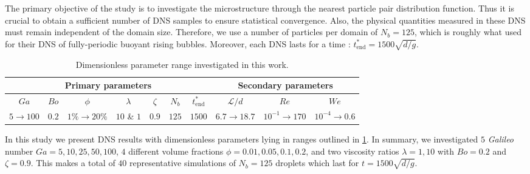 The primary objective of the study is to investigate the microstructure through the nearest particle pair distribution function.
Thus it is crucial to obtain a sufficient number of DNS samples to ensure statistical convergence. 
Also, the physical quantities measured in these DNS must remain independent of the domain size. 
Therefore, we use a number of particles per domain of $N_b = 125$, which is roughly what \citet{hidman2023assessing} used for their DNS of fully-periodic buoyant rising bubbles.
Moreover, each DNS lasts for a time : $t^*_\text{end} = 1500 \sqrt{d/g}$.
\begin{table}[h!]
    \centering
    \caption{Dimensionless parameter range investigated in this work.}
    \begin{tabular}{|ccccccc|ccc|}\hline
        \multicolumn{7}{|c|}{Primary parameters}&\multicolumn{3}{|c|}{Secondary parameters}\\\hline\hline
        $Ga$&$Bo$&$\phi$&$\lambda$&$\zeta$&$N_b$&$t^*_\text{end}$&$\mathcal{L}/d$&$Re$&$We$\\ \hline
        $5\rightarrow 100$&$0.2$&$1\% \rightarrow 20\%$&$10$ \& $1$&$0.9$&$125$&$1500$&$6.7\to 18.7$&$10^{-1}\to 170$&$10^{-4}\to 0.6$\\ \hline
    \end{tabular}
    \label{tab:simulations}
\end{table}
In this study we present DNS results with dimensionless parameters lying in ranges outlined in \ref{tab:simulations}.
In summary, we investigated $5$ \textit{Galileo} number $Ga = 5,10,25,50,100$, $4$ different volume fractions $\phi = 0.01,0.05,0.1,0.2$, and two viscosity ratios $\lambda =1,10$ with $Bo = 0.2$ and $\zeta = 0.9$. %
This makes a total of $40$ representative simulations of $N_b = 125$ droplets which last for $t= 1500 \sqrt{d/g}$. 
